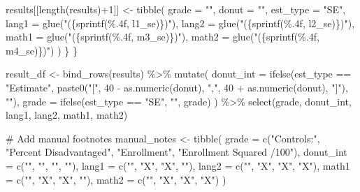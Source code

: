 \documentclass[
  letterpaper,
  DIV=11,
  numbers=noendperiod]{scrartcl}
\newenvironment{Shaded}{\begin{snugshade}}{\end{snugshade}}
\newcommand{\AttributeTok}[1]{\textcolor[rgb]{0.40,0.45,0.13}{#1}}
\newcommand{\CommentTok}[1]{\textcolor[rgb]{0.37,0.37,0.37}{#1}}
\newcommand{\DecValTok}[1]{\textcolor[rgb]{0.68,0.00,0.00}{#1}}
\newcommand{\FunctionTok}[1]{\textcolor[rgb]{0.28,0.35,0.67}{#1}}
\newcommand{\NormalTok}[1]{\textcolor[rgb]{0.00,0.23,0.31}{#1}}
\newcommand{\OtherTok}[1]{\textcolor[rgb]{0.00,0.23,0.31}{#1}}
\newcommand{\SpecialCharTok}[1]{\textcolor[rgb]{0.37,0.37,0.37}{#1}}
\newcommand{\StringTok}[1]{\textcolor[rgb]{0.13,0.47,0.30}{#1}}
\begin{document}
\begin{Shaded}
\begin{Highlighting}[]
\NormalTok{    results[[}\FunctionTok{length}\NormalTok{(results)}\SpecialCharTok{+}\DecValTok{1}\NormalTok{]] }\OtherTok{\textless{}{-}} \FunctionTok{tibble}\NormalTok{(}
      \AttributeTok{grade =} \StringTok{""}\NormalTok{, }\AttributeTok{donut =} \StringTok{""}\NormalTok{, }\AttributeTok{est\_type =} \StringTok{"SE"}\NormalTok{,}
      \AttributeTok{lang1 =} \FunctionTok{glue}\NormalTok{(}\StringTok{"(\{sprintf(\textquotesingle{}\%.4f\textquotesingle{}, l1\_se)\})"}\NormalTok{),}
      \AttributeTok{lang2 =} \FunctionTok{glue}\NormalTok{(}\StringTok{"(\{sprintf(\textquotesingle{}\%.4f\textquotesingle{}, l2\_se)\})"}\NormalTok{),}
      \AttributeTok{math1 =} \FunctionTok{glue}\NormalTok{(}\StringTok{"(\{sprintf(\textquotesingle{}\%.4f\textquotesingle{}, m3\_se)\})"}\NormalTok{),}
      \AttributeTok{math2 =} \FunctionTok{glue}\NormalTok{(}\StringTok{"(\{sprintf(\textquotesingle{}\%.4f\textquotesingle{}, m4\_se)\})"}\NormalTok{)}
\NormalTok{    )}
\NormalTok{  \}}
\NormalTok{\}}

\NormalTok{result\_df }\OtherTok{\textless{}{-}} \FunctionTok{bind\_rows}\NormalTok{(results) }\SpecialCharTok{\%\textgreater{}\%}
  \FunctionTok{mutate}\NormalTok{(}
    \AttributeTok{donut\_int =} \FunctionTok{ifelse}\NormalTok{(est\_type }\SpecialCharTok{==} \StringTok{"Estimate"}\NormalTok{, }\FunctionTok{paste0}\NormalTok{(}\StringTok{"["}\NormalTok{, }\DecValTok{40} \SpecialCharTok{{-}} \FunctionTok{as.numeric}\NormalTok{(donut), }\StringTok{","}\NormalTok{, }\DecValTok{40} \SpecialCharTok{+} \FunctionTok{as.numeric}\NormalTok{(donut), }\StringTok{"]"}\NormalTok{), }\StringTok{""}\NormalTok{),}
    \AttributeTok{grade =} \FunctionTok{ifelse}\NormalTok{(est\_type }\SpecialCharTok{==} \StringTok{"SE"}\NormalTok{, }\StringTok{""}\NormalTok{, grade)}
\NormalTok{  ) }\SpecialCharTok{\%\textgreater{}\%}
  \FunctionTok{select}\NormalTok{(grade, donut\_int, lang1, lang2, math1, math2)}

\CommentTok{\# Add manual footnotes}
\NormalTok{manual\_notes }\OtherTok{\textless{}{-}} \FunctionTok{tibble}\NormalTok{(}
  \AttributeTok{grade =} \FunctionTok{c}\NormalTok{(}\StringTok{"Controls:"}\NormalTok{, }\StringTok{"Percent Disadvantaged"}\NormalTok{, }\StringTok{"Enrollment"}\NormalTok{, }\StringTok{"Enrollment Squared /100"}\NormalTok{),}
  \AttributeTok{donut\_int =} \FunctionTok{c}\NormalTok{(}\StringTok{""}\NormalTok{, }\StringTok{""}\NormalTok{, }\StringTok{""}\NormalTok{, }\StringTok{""}\NormalTok{),}
  \AttributeTok{lang1 =} \FunctionTok{c}\NormalTok{(}\StringTok{""}\NormalTok{, }\StringTok{"X"}\NormalTok{, }\StringTok{"X"}\NormalTok{, }\StringTok{""}\NormalTok{),}
  \AttributeTok{lang2 =} \FunctionTok{c}\NormalTok{(}\StringTok{""}\NormalTok{, }\StringTok{"X"}\NormalTok{, }\StringTok{"X"}\NormalTok{, }\StringTok{"X"}\NormalTok{),}
  \AttributeTok{math1 =} \FunctionTok{c}\NormalTok{(}\StringTok{""}\NormalTok{, }\StringTok{"X"}\NormalTok{, }\StringTok{"X"}\NormalTok{, }\StringTok{""}\NormalTok{),}
  \AttributeTok{math2 =} \FunctionTok{c}\NormalTok{(}\StringTok{""}\NormalTok{, }\StringTok{"X"}\NormalTok{, }\StringTok{"X"}\NormalTok{, }\StringTok{"X"}\NormalTok{)}
\NormalTok{)}


\end{Highlighting}
\end{Shaded}
\end{document}

